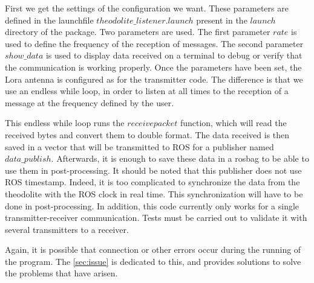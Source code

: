 \documentclass[10pt,letterpaper,oneside]{article}
\begin{document}
First we get the settings of the configuration we want.
These parameters are defined in the launchfile $theodolite\_listener.launch$ present in the $launch$ directory of the package.
Two parameters are used.
The first parameter $rate$ is used to define the frequency of the reception of messages.
The second parameter $show\_data$ is used to display data received on a terminal to debug or verify that the communication is working properly.
Once the parameters have been set, the Lora antenna is configured as for the transmitter code.
The difference is that we use an endless while loop, in order to listen at all times to the reception of a message at the frequency defined by the user.

This endless while loop runs the $receivepacket$ function, which will read the received bytes and convert them to double format.
The data received is then saved in a vector that will be transmitted to ROS for a publisher named $data\_publish$.
Afterwards, it is enough to save these data in a rosbag to be able to use them in post-processing.
It should be noted that this publisher does not use ROS timestamp.
Indeed, it is too complicated to synchronize the data from the theodolite with the ROS clock in real time.
This synchronization will have to be done in post-processing.
In addition, this code currently only works for a single transmitter-receiver communication.
Tests must be carried out to validate it with several transmitters to a receiver.

Again, it is possible that connection or other errors occur during the running of the program.
The \autoref{sec:issue} is dedicated to this, and provides solutions to solve the problems that have arisen.


\end{document}
